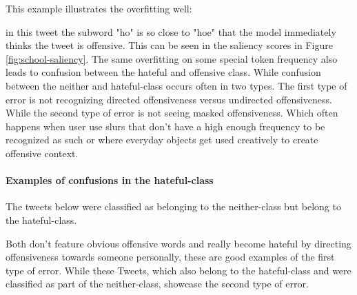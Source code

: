 \documentclass[11pt,a4paper]{article}
\begin{document}
This example illustrates the overfitting well:
\begin{center}
  \newline
\end{center}

in this tweet the subword "ho" is so close to "hoe" that the model immediately thinks the tweet is offensive.
This can be seen in the saliency scores in Figure \ref{fig:school-saliency}.
The same overfitting on some special token frequency also leads to confusion between the hateful and offensive class.
While confusion between the neither and hateful-class occurs often in two types.
The first type of error is not recognizing directed offensiveness versus undirected offensiveness.
While the second type of error is not seeing masked offensiveness.
Which often happens when user use slurs that don't have a high enough frequency to be recognized as such 
or where everyday objects get used creatively to create offensive context.

\paragraph{Examples of confusions in the hateful-class}
The tweets below were classified as belonging to the neither-class but belong to the hateful-class.

\begin{center}
  \newline
  \newline
\end{center}

Both don't feature obvious offensive words and really become hateful by directing offensiveness towards someone personally, 
these are good examples of the first type of error.
While these Tweets, which also belong to the hateful-class and were classified as part of the neither-class, showcase the second type of error.
\begin{center}
  \newline
   \newline
   \newline
\end{center}
\end{document}
